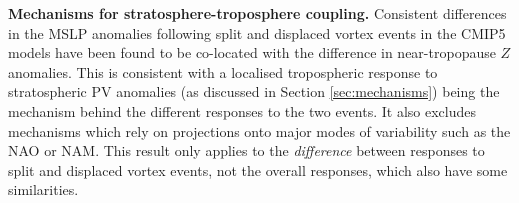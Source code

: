 \bigskip\noindent\textbf{Mechanisms for stratosphere-troposphere coupling.} Consistent
differences in the MSLP anomalies following split and displaced vortex events in
the CMIP5 models have been found to be co-located with the difference in
near-tropopause $Z$ anomalies. This is consistent with a localised tropospheric
response to stratospheric PV anomalies (as discussed in Section
\ref{sec:mechanisms}) being the mechanism behind the different responses to the
two events. It also excludes mechanisms which rely on projections onto major
modes of variability such as the NAO or NAM. This result only applies to the
\emph{difference} between responses to split and displaced vortex events, not
the overall responses, which also have some similarities.


